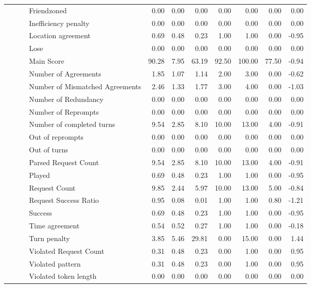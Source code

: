 \begin{tabular}{llllrrrrrrr}
 &  &  & Friendzoned & 0.00 & 0.00 & 0.00 & 0.00 & 0.00 & 0.00 & 0.00 \\
 &  &  & Inefficiency penalty & 0.00 & 0.00 & 0.00 & 0.00 & 0.00 & 0.00 & 0.00 \\
 &  &  & Location agreement & 0.69 & 0.48 & 0.23 & 1.00 & 1.00 & 0.00 & -0.95 \\
 &  &  & Lose & 0.00 & 0.00 & 0.00 & 0.00 & 0.00 & 0.00 & 0.00 \\
 &  &  & Main Score & 90.28 & 7.95 & 63.19 & 92.50 & 100.00 & 77.50 & -0.94 \\
 &  &  & Number of Agreements & 1.85 & 1.07 & 1.14 & 2.00 & 3.00 & 0.00 & -0.62 \\
 &  &  & Number of Mismatched Agreements & 2.46 & 1.33 & 1.77 & 3.00 & 4.00 & 0.00 & -1.03 \\
 &  &  & Number of Redundancy & 0.00 & 0.00 & 0.00 & 0.00 & 0.00 & 0.00 & 0.00 \\
 &  &  & Number of Reprompts & 0.00 & 0.00 & 0.00 & 0.00 & 0.00 & 0.00 & 0.00 \\
 &  &  & Number of completed turns & 9.54 & 2.85 & 8.10 & 10.00 & 13.00 & 4.00 & -0.91 \\
 &  &  & Out of reprompts & 0.00 & 0.00 & 0.00 & 0.00 & 0.00 & 0.00 & 0.00 \\
 &  &  & Out of turns & 0.00 & 0.00 & 0.00 & 0.00 & 0.00 & 0.00 & 0.00 \\
 &  &  & Parsed Request Count & 9.54 & 2.85 & 8.10 & 10.00 & 13.00 & 4.00 & -0.91 \\
 &  &  & Played & 0.69 & 0.48 & 0.23 & 1.00 & 1.00 & 0.00 & -0.95 \\
 &  &  & Request Count & 9.85 & 2.44 & 5.97 & 10.00 & 13.00 & 5.00 & -0.84 \\
 &  &  & Request Success Ratio & 0.95 & 0.08 & 0.01 & 1.00 & 1.00 & 0.80 & -1.21 \\
 &  &  & Success & 0.69 & 0.48 & 0.23 & 1.00 & 1.00 & 0.00 & -0.95 \\
 &  &  & Time agreement & 0.54 & 0.52 & 0.27 & 1.00 & 1.00 & 0.00 & -0.18 \\
 &  &  & Turn penalty & 3.85 & 5.46 & 29.81 & 0.00 & 15.00 & 0.00 & 1.44 \\
 &  &  & Violated Request Count & 0.31 & 0.48 & 0.23 & 0.00 & 1.00 & 0.00 & 0.95 \\
 &  &  & Violated pattern & 0.31 & 0.48 & 0.23 & 0.00 & 1.00 & 0.00 & 0.95 \\
 &  &  & Violated token length & 0.00 & 0.00 & 0.00 & 0.00 & 0.00 & 0.00 & 0.00 \\

\end{tabular}
